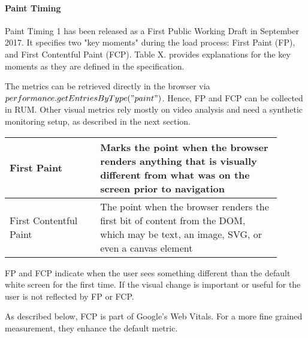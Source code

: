

\paragraph{Paint Timing}

Paint Timing 1 has been released as a First Public Working Draft in September 2017.  
It specifies two "key moments" during the load process: First Paint (FP), and First Contentful Paint (FCP).
Table X. provides explanations for the key moments as they are defined in the specification. %

The metrics can be retrieved directly in the browser via $performance.getEntriesByType("paint")$.
Hence, FP and FCP can be collected in RUM.
Other visual metrics rely mostly on video analysis and need a synthetic monitoring setup, as described in the next section.

\begin{center}
\small
	\begin{tabular}{ | p{0.3\linewidth} | p{0.6\linewidth} | }
	\hline
	First Paint & Marks the point when the browser renders anything that is visually different from what was on the screen prior to navigation \\ 
	\hline
	First Contentful Paint & The point when the browser renders the first bit of content from the DOM, which may be text, an image, SVG, or even a canvas element \\  
	\hline
	\end{tabular}
\end{center}


FP and FCP indicate when the user sees something different than the default white screen for the first time.
If the visual change is important or useful for the user is not reflected by FP or FCP. %

As described below, FCP is part of Google's Web Vitals.
For a more fine grained measurement, they enhance the default metric.








